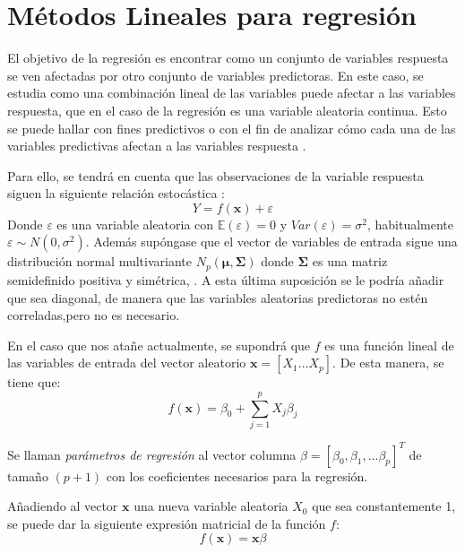 \section{Métodos Lineales para regresión}

\noindent El objetivo de la regresión es encontrar como un conjunto de variables respuesta se ven afectadas por otro conjunto de variables predictoras. En este caso, se estudia como una combinación lineal de las variables puede afectar a las variables respuesta, que en el caso de la regresión es una variable aleatoria continua. Esto se puede hallar con fines predictivos o con el fin de analizar cómo cada una de las variables predictivas afectan a las variables respuesta \cite{Johnson 2007}. 

\noindent Para ello, se tendrá en cuenta que las observaciones de la variable respuesta siguen la siguiente relación estocástica \cite{Hastie 2001, Johnson 2007}:
\begin{equation}
Y=f(\textbf{x})+\varepsilon
\end{equation}
\noindent Donde $\varepsilon$ es una variable aleatoria con $\mathbb{E}(\varepsilon)=0$ y $Var(\varepsilon)=\sigma^2$, habitualmente $\varepsilon \sim N(0,\sigma^2)$. Además supóngase que el vector de variables de entrada sigue una distribución normal multivariante $N_p(\mathbf{\mu},\mathbf{\Sigma})$ donde $\mathbf{\Sigma }$ es una matriz semidefinido positiva y simétrica,  \cite{Chatfield 1989}. A esta última suposición se le podría añadir que sea diagonal, de manera que las variables aleatorias predictoras no estén correladas,pero no es necesario. 


\noindent En el caso que nos atañe actualmente, se supondrá que $f$ es una función lineal de las variables de entrada del vector aleatorio $\textbf{x}=[X_1\ldots X_p]$. De esta manera, se tiene que:  
\begin{equation}
f(\textbf{x})=\beta_0+\sum_{j=1}^p X_j\beta_j
\end{equation}

\begin{defi}
Se llaman \emph{parámetros de regresión} al vector columna $\beta=[\beta_0, \beta_1, \ldots \beta_p]^T$ de tamaño $(p+1)$ con los coeficientes necesarios para la regresión. 
\end{defi} 

\noindent Añadiendo al vector $\mathbf{x}$ una nueva variable aleatoria $X_0$ que sea constantemente 1, se puede dar la siguiente expresión matricial de la función $f$:
\begin{equation}
f(\mathbf{x})= \mathbf{x}\beta
\end{equation}


